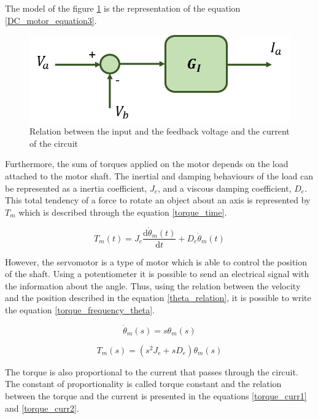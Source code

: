 The model of the figure \ref{model1} is the representation of the equation \ref{DC_motor_equation3}.

\begin{figure}[H]
\centering
\includegraphics[scale=0.6]{figures/model1.png}
\caption{Relation between the input and the feedback voltage and the current of the circuit}
\label{model1}
\end{figure}

Furthermore, the sum of torques applied on the motor depends on the load attached to the motor shaft. The inertial and damping behaviours of the load can be represented as a inertia coefficient, $J_{e}$, and a viscous damping coefficient, $D_{e}$. This total tendency of a force to rotate an object about an axis is represented by $T_{m}$ which is described through the equation \ref{torque_time}. 

\begin{equation}\label{torque_time}
T_{m}(t)= J_{e}\frac{\mathrm{d} \dot{\theta}_{m}(t)}{\mathrm{d} t}+D_{e}\dot{\theta}_{m}(t)
\end{equation}

However, the servomotor is a type of motor which is able to control the position of the shaft. Using a potentiometer it is possible to send an electrical signal with the information about the angle. Thus, using the relation between the velocity and the position described in the equation \ref{theta_relation}, it is possible to write the equation \ref{torque_frequency_theta}.

\begin{equation}\label{theta_relation}
\dot{\theta}_{m}(s)= s\theta_{m}(s)
\end{equation}

\begin{equation}\label{torque_frequency_theta}
T_{m}(s)= (s^{2}J_{e} + sD_{e})\theta_{m}(s)
\end{equation}

The torque is also proportional to the current that passes through the circuit. The constant of proportionality is called torque constant and the relation between the torque and the current is presented in the equations \ref{torque_curr1} and \ref{torque_curr2}.

